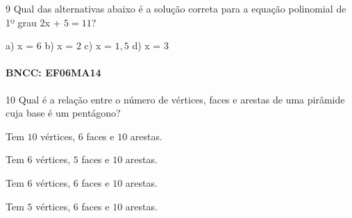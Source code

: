 {%

\num{9}  Qual das alternativas abaixo é a solução correta para a equação
polinomial de 1º grau $2$x + $5 = 11$?

\begin{escolha}
a) x = $6$
b) x = $2$
c) x = $1,5$
d) x = $3$
\end{escolha}

\paragraph{BNCC: EF06MA14 }


\num{10} Qual é a relação entre o número de vértices, faces e arestas de uma
pirâmide cuja base é um pentágono?

\begin{escolha}
\item Tem $10$ vértices, $6$ faces e $10$ arestas.
\item Tem $6$ vértices, $5$ faces e $10$ arestas.
\item Tem $6$ vértices, $6$ faces e $10$ arestas.
\item Tem $5$ vértices, $6$ faces e $10$ arestas.
\end{escolha}

}
